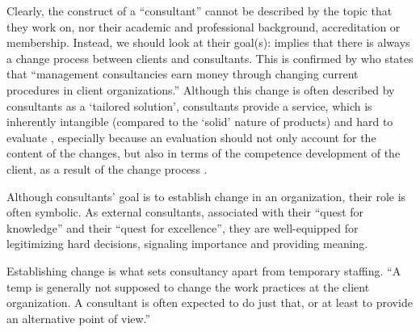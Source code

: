 \documentclass[12pt]{article}
\begin{document}
Clearly, the construct of a ``consultant'' cannot be described by the
topic that they work on, nor their academic and professional background,
accreditation or membership. Instead, we should look at their goal(s):
\citet[1]{werr1986} implies that there is always a change process
between clients and consultants. This is confirmed by
\citet[12]{kipping2000} who states that ``management consultancies earn
money through changing current procedures in client organizations.''
Although this change is often described by consultants as a `tailored
solution', consultants provide a service, which is inherently intangible
(compared to the `solid' nature of products) and hard to evaluate
\citep[ 348]{fincham1999}, especially because an evaluation should not
only account for the content of the changes, but also in terms of the
competence development of the client, as a result of the change process
\citep[ 17]{werr1986}.

Although consultants' goal is to establish change in an organization,
their role is often symbolic. As external consultants, associated with
their ``quest for knowledge'' and their ``quest for excellence'', they
are \citep[ 9-13]{pellegrin2006} well-equipped for legitimizing hard
decisions, signaling importance and providing meaning.

Establishing change is what sets consultancy apart from temporary
staffing. ``A temp is generally not supposed to change the work
practices at the client organization. A consultant is often expected to
do just that, or at least to provide an alternative point of view.''
\citep[ 5]{furusten2000}
\end{document}
